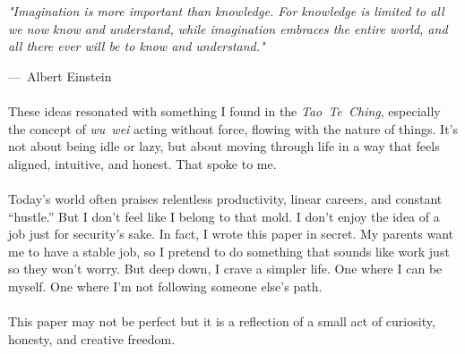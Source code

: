 \documentclass[12pt,oneside]{book}
\begin{document}
\begin{displayquote}
\itshape
"Imagination is more important than knowledge. 
For knowledge is limited to all we now know and understand,
while imagination embraces the entire world, and all there ever will be to know and understand."
\end{displayquote}

\hfill—\, Albert Einstein \\
\\
These ideas resonated with something I found in the \emph{Tao Te Ching}, especially the concept of \emph{wu wei} acting without force, flowing with the nature of things. It’s not about being idle or lazy, but about moving through life in a way that feels aligned, intuitive, and honest. That spoke to me. \\
\\
Today’s world often praises relentless productivity, linear careers, and constant “hustle.” But I don’t feel like I belong to that mold. I don’t enjoy the idea of a job just for security’s sake. In fact, I wrote this paper in secret. My parents want me to have a stable job, so I pretend to do something that sounds like work just so they won’t worry. But deep down, I crave a simpler life. One where I can be myself. One where I’m not following someone else’s path.\\
\\
This paper may not be perfect but it is a reflection of a small act of curiosity, honesty, and creative freedom.




\tableofcontents
\clearpage
\listoffigures  
\clearpage

\mainmatter












\appendix








  

\end{document}
